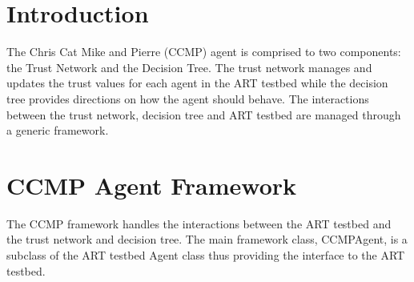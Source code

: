\documentclass[letterpaper,10pt]{article}
\numberwithin{equation}{section}
\begin{document}
\section{Introduction}
The Chris Cat Mike and Pierre (CCMP) agent is comprised to two components: the
Trust Network and the Decision Tree. The trust network manages and updates the
trust values for each agent in the ART testbed while the decision tree provides
directions on how the agent should behave.  The interactions between the trust
network, decision tree and ART testbed are managed through a generic framework.

\section{CCMP Agent Framework}
The CCMP framework handles the interactions between the ART testbed and the
trust network and decision tree.  The main framework class, CCMPAgent, is a
subclass of the ART testbed Agent class thus providing the interface to the ART
testbed.




\end{document}
